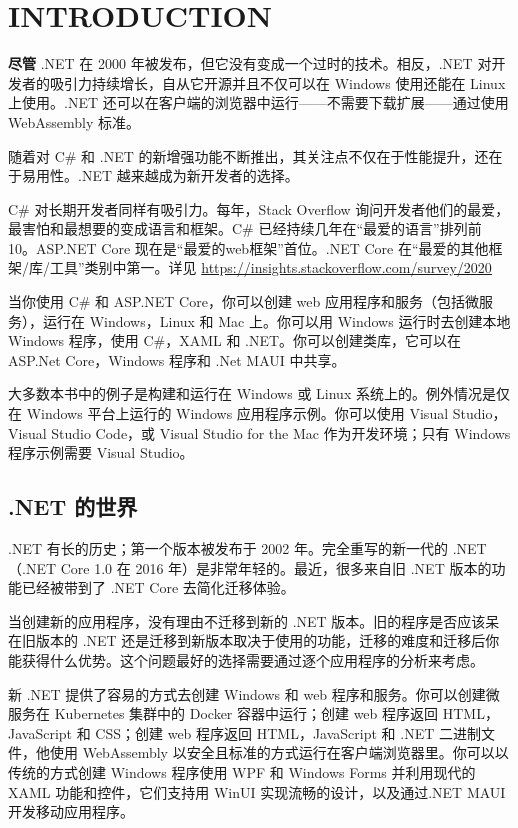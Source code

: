 \chapter*{INTRODUCTION}
\textbf{尽管} .NET 在 2000 年被发布，但它没有变成一个过时的技术。相反，.NET 对开发者的吸引力持续增长，自从它开源并且不仅可以在 Windows 使用还能在 Linux 上使用。.NET 还可以在客户端的浏览器中运行——不需要下载扩展——通过使用 WebAssembly 标准。

随着对 C\# 和 .NET 的新增强功能不断推出，其关注点不仅在于性能提升，还在于易用性。.NET 越来越成为新开发者的选择。

C\# 对长期开发者同样有吸引力。每年，Stack Overflow 询问开发者他们的最爱，最害怕和最想要的变成语言和框架。C\# 已经持续几年在“最爱的语言”排列前 10。ASP.NET Core 现在是“最爱的web框架”首位。.NET Core 在“最爱的其他框架/库/工具”类别中第一。详见 \url{https://insights.stackoverflow.com/survey/2020}

当你使用 C\# 和 ASP.NET Core，你可以创建 web 应用程序和服务（包括微服务），运行在 Windows，Linux 和 Mac 上。你可以用 Windows 运行时去创建本地 Windows 程序，使用 C\#，XAML 和 .NET。你可以创建类库，它可以在 ASP.Net Core，Windows 程序和 .Net MAUI 中共享。

大多数本书中的例子是构建和运行在 Windows 或 Linux 系统上的。例外情况是仅在 Windows 平台上运行的 Windows 应用程序示例。你可以使用 Visual Studio，Visual Studio Code，或 Visual Studio for the Mac 作为开发环境；只有 Windows 程序示例需要 Visual Studio。

\section*{.NET 的世界}
.NET 有长的历史；第一个版本被发布于 2002 年。完全重写的新一代的 .NET（.NET Core 1.0 在 2016 年）是非常年轻的。最近，很多来自旧 .NET 版本的功能已经被带到了 .NET Core 去简化迁移体验。

当创建新的应用程序，没有理由不迁移到新的 .NET 版本。旧的程序是否应该呆在旧版本的 .NET 还是迁移到新版本取决于使用的功能，迁移的难度和迁移后你能获得什么优势。这个问题最好的选择需要通过逐个应用程序的分析来考虑。

新 .NET 提供了容易的方式去创建 Windows 和 web 程序和服务。你可以创建微服务在 Kubernetes 集群中的 Docker 容器中运行；创建 web 程序返回 HTML，JavaScript 和 CSS；创建 web 程序返回 HTML，JavaScript 和 .NET 二进制文件，他使用 WebAssembly 以安全且标准的方式运行在客户端浏览器里。你可以以传统的方式创建 Windows 程序使用 WPF 和 Windows Forms 并利用现代的 XAML 功能和控件，它们支持用 WinUI 实现流畅的设计，以及通过.NET MAUI 开发移动应用程序。

